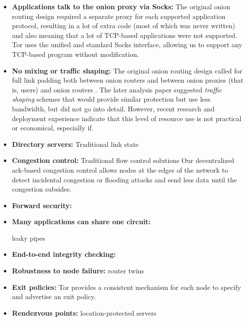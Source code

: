 \documentclass[times,10pt,twocolumn]{article}
\begin{document}
\begin{itemize}

\item \textbf{Applications talk to the onion proxy via Socks:}
The original onion routing design required a separate proxy for each
supported application protocol, resulting in a lot of extra code (most
of which was never written) and also meaning that a lot of TCP-based
applications were not supported. Tor uses the unified and standard Socks
\cite{socks4,socks5} interface, allowing us to support any TCP-based
program without modification.

\item \textbf{No mixing or traffic shaping:} The original onion routing
design called for full link padding both between onion routers and between
onion proxies (that is, users) and onion routers \cite{or-journal}. The
later analysis paper \cite{or-pet} suggested \emph{traffic shaping}
schemes that would provide similar protection but use less bandwidth,
but did not go into detail. However, recent research \cite{econymics}
and deployment experience \cite{freedom2-arch} indicate that this level
of resource use is not practical or economical, especially if.

\item \textbf{Directory servers:} Traditional link state

\item \textbf{Congestion control:} Traditional flow control solutions
 Our decentralized ack-based congestion control
allows nodes at the edges of the network to detect incidental congestion
or flooding attacks and send less data until the congestion subsides.


\item \textbf{Forward security:}

\item \textbf{Many applications can share one circuit:}

leaky pipes

\item \textbf{End-to-end integrity checking:}

\item \textbf{Robustness to node failure:} router twins

\item \textbf{Exit policies:}
Tor provides a consistent mechanism for each node to specify and
advertise an exit policy.

\item \textbf{Rendezvous points:}
location-protected servers

\end{itemize}
\end{document}
